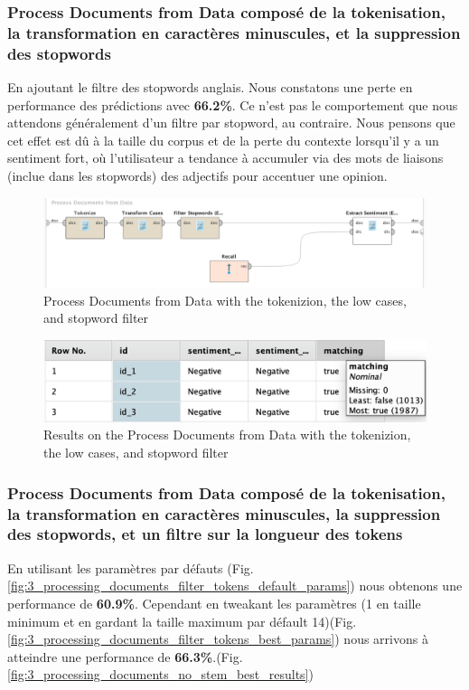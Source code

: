 \documentclass[a4paper]{article}
\begin{document}
\subsubsection{Process Documents from Data composé de la tokenisation, la transformation en caractères minuscules, et la suppression des stopwords}
En ajoutant le filtre des stopwords anglais. Nous constatons une perte en performance des prédictions avec \textbf{66.2\%}. Ce n'est pas le comportement que nous attendons généralement d'un filtre par stopword, au contraire. Nous pensons que cet effet est dû à la taille du corpus et de la perte du contexte lorsqu'il y a un sentiment fort, où l'utilisateur a tendance à accumuler via des mots de liaisons (inclue dans les stopwords) des adjectifs pour accentuer une opinion.
\begin{figure}[H]
	\includegraphics[width=\linewidth]{imgs/part_3/3_processing_documents_no_stem_filter_token}
	\caption{Process Documents from Data with the tokenizion, the low cases, and stopword filter}
	\label{fig:3_processing_documents_no_stem_filter_token}
\end{figure}
\begin{figure}[H]
	\includegraphics[width=\linewidth]{imgs/part_3/3_processing_documents_no_stem_filter_token_results}
	\caption{Results on the Process Documents from Data with the tokenizion, the low cases, and stopword filter}
	\label{fig:3_processing_documents_no_stem_filter_token_results}
\end{figure}

\vspace{6pt}
\subsubsection{Process Documents from Data composé de la tokenisation, la transformation en caractères minuscules, la suppression des stopwords, et un filtre sur la longueur des tokens}
En utilisant les paramètres par défauts (Fig.\ref{fig:3_processing_documents_filter_tokens_default_params}) nous obtenons une performance de \textbf{60.9\%}. Cependant en tweakant les paramètres (1 en taille minimum et en gardant la taille maximum par défault 14)(Fig.\ref{fig:3_processing_documents_filter_tokens_best_params}) nous arrivons à atteindre une performance de \textbf{66.3\%}.(Fig.\ref{fig:3_processing_documents_no_stem_best_results})
\end{document}
